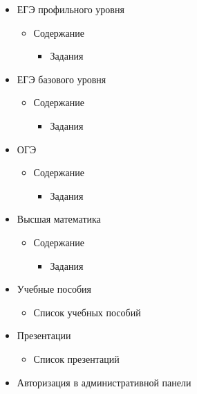 \begin{itemize}
	\item ЕГЭ профильного уровня
	\begin{itemize}
		\item Содержание
		\begin{itemize}
			\item Задания
		\end{itemize}
	\end{itemize}

	\item ЕГЭ базового уровня
	\begin{itemize}
		\item Содержание
		\begin{itemize}
			\item Задания
		\end{itemize}
	\end{itemize}

	\item ОГЭ
	\begin{itemize}
		\item Содержание
		\begin{itemize}
			\item Задания
		\end{itemize}
	\end{itemize}

	\item Высшая математика
	\begin{itemize}
		\item Содержание
		\begin{itemize}
			\item Задания
		\end{itemize}
	\end{itemize}

	\item Учебные пособия
	\begin{itemize}
		\item Список учебных пособий
	\end{itemize}

	\item Презентации
	\begin{itemize}
		\item Список презентаций
	\end{itemize}

	\item Авторизация в административной панели
\end{itemize}

